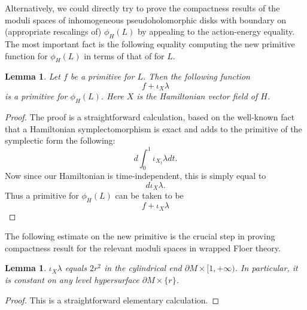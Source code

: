 \documentclass{amsart}
\newtheorem{lemma}[theorem]{Lemma}
\numberwithin{equation}{section}
\numberwithin{figure}{section}
\begin{document}
	Alternatively, we could directly try to prove the compactness results of the moduli spaces of inhomogeneous pseudoholomorphic disks with boundary on (appropriate rescalings of) $\phi_{H}(L)$ by appealing to the action-energy equality. The most important fact is the following equality computing the new primitive function for $\phi_{H}(L)$ in terms of that of for $L$. \par

\begin{lemma}\label{changing primitive under Hamiltonian isotopy}
Let $f$ be a primitive for $L$. Then the following function
\begin{equation}
f + \iota_{X}\lambda
\end{equation}
is a primitive for $\phi_{H}(L)$. Here $X$ is the Hamiltonian vector field of $H$.
\end{lemma}
\begin{proof}
	The proof is a straightforward calculation, based on the well-known fact that a Hamiltonian symplectomorphism is exact and adds to the primitive of the symplectic form the following:
\begin{equation}
d\int_{0}^{1} \iota_{X_{t}}\lambda dt.
\end{equation}
Now since our Hamiltonian is time-independent, this is simply equal to
\begin{equation}
d \iota_{X}\lambda.
\end{equation}
Thus a primitive for $\phi_{H}(L)$ can be taken to be
\begin{equation}
f + \iota_{X}\lambda
\end{equation}
\end{proof}

	The following estimate on the new primitive is the crucial step in proving compactness result for the relevant moduli spaces in wrapped Floer theory. \par

\begin{lemma}
$\iota_{X}\lambda$ equals $2r^{2}$ in the cylindrical end $\partial M \times [1, +\infty)$. In particular, it is constant on any level hypersurface $\partial M \times \{r\}$.
\end{lemma}
\begin{proof}
This is a straightforward elementary calculation.
\end{proof}
\end{document}
